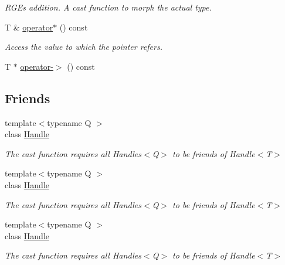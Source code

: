 \begin{DoxyCompactItemize}
\begin{DoxyCompactList}\small\item\em R\+GE\textquotesingle{}s addition. A cast function to morph the actual type. \end{DoxyCompactList}\item 
T \& \mbox{\hyperlink{classADAT_1_1Handle_a86f851b3a2e8a6084e50bfad306260f4}{operator$\ast$}} () const
\begin{DoxyCompactList}\small\item\em Access the value to which the pointer refers. \end{DoxyCompactList}\item 
T $\ast$ \mbox{\hyperlink{classADAT_1_1Handle_ad58ef1e032066f7d6b01c2a76cfac5e4}{operator-\/$>$}} () const
\end{DoxyCompactItemize}
\subsection*{Friends}
\begin{DoxyCompactItemize}
\item 
{\footnotesize template$<$typename Q $>$ }\\class \mbox{\hyperlink{classADAT_1_1Handle_a67ca1a2d91273eaf85fb3d23ba8ce984}{Handle}}
\begin{DoxyCompactList}\small\item\em The cast function requires all Handles$<$\+Q$>$ to be friends of Handle$<$\+T$>$ \end{DoxyCompactList}\item 
{\footnotesize template$<$typename Q $>$ }\\class \mbox{\hyperlink{classADAT_1_1Handle_a7b22116ca951d48056220c7ad9620e85}{Handle}}
\begin{DoxyCompactList}\small\item\em The cast function requires all Handles$<$\+Q$>$ to be friends of Handle$<$\+T$>$ \end{DoxyCompactList}\item 
{\footnotesize template$<$typename Q $>$ }\\class \mbox{\hyperlink{classADAT_1_1Handle_a7b22116ca951d48056220c7ad9620e85}{Handle}}
\begin{DoxyCompactList}\small\item\em The cast function requires all Handles$<$\+Q$>$ to be friends of Handle$<$\+T$>$ \end{DoxyCompactList}\end{DoxyCompactItemize}


